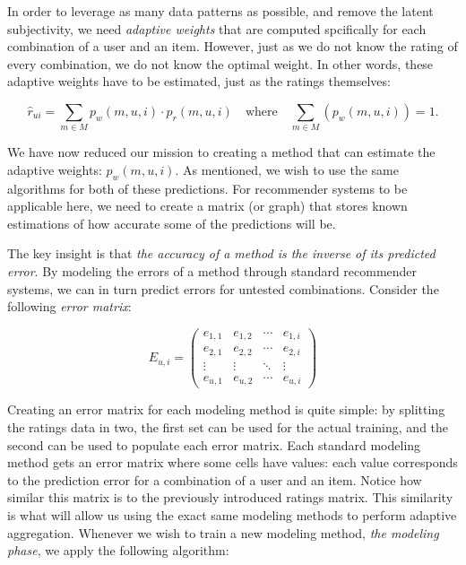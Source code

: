 In order to leverage as many data patterns as possible, and remove the latent subjectivity,
we need \emph{adaptive weights} that are computed spcifically for each combination of a user and an item.
However, just as we do not know the rating of every combination, we do not know the optimal weight.
In other words, these adaptive weights have to be estimated, just as the ratings themselves:

\begin{equation*}
  \hat{r}_{ui} = \sum_{m \in M} p_{w}(m,u,i) \cdot p_{r}(m,u,i)
  \quad \text{where} \quad
  \sum_{m \in M} (p_{w}(m,u,i)) = 1.
\end{equation*}

We have now reduced our mission to creating a method that can estimate the adaptive weights: $p_{w}(m,u,i)$.
As mentioned, we wish to use the same algorithms for both of these predictions.
For recommender systems to be applicable here, we need to create a matrix (or graph)
that stores known estimations of how accurate some of the predictions will be.

The key insight is that \emph{the accuracy of a method is the inverse of its predicted error}.
By modeling the errors of a method through standard recommender systems,
we can in turn predict errors for untested combinations.
Consider the following \emph{error matrix}:

\begin{equation*}
 E_{u,i} =
 \begin{pmatrix}
    e_{1,1} & e_{1,2} & \cdots & e_{1,i} \\
    e_{2,1} & e_{2,2} & \cdots & e_{2,i} \\
    \vdots  & \vdots  & \ddots & \vdots  \\
    e_{u,1} & e_{u,2} & \cdots & e_{u,i}
 \end{pmatrix}
\end{equation*}

Creating an error matrix for each modeling method is quite simple:
by splitting the ratings data in two,
the first set can be used for the actual training, and the second
can be used to populate each error matrix.
Each standard modeling method gets an error matrix where some cells have values:
each value corresponds to the prediction error for a combination of a user and an item.
Notice how similar this matrix is to the previously introduced ratings matrix.
This similarity is what will allow us using the exact same modeling methods
to perform adaptive aggregation.
Whenever we wish to train a new modeling method,
\emph{the modeling phase}, we apply the following algorithm:

